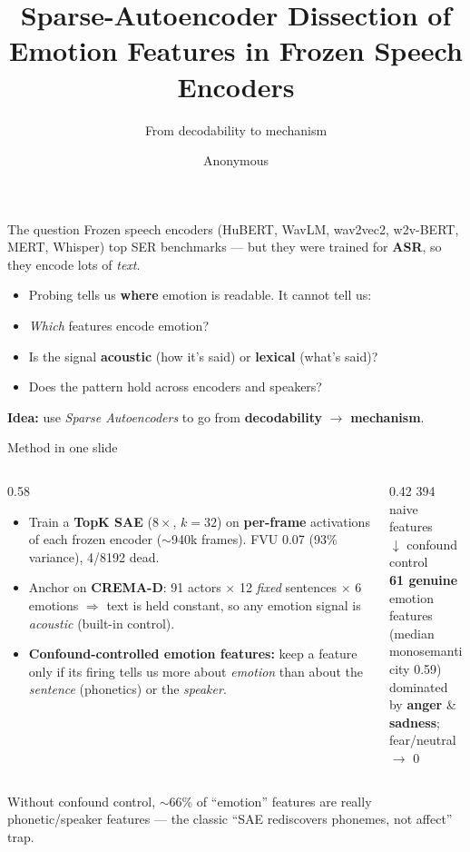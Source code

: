 \documentclass[aspectratio=169]{beamer}
\title[SAE Dissection of SER]{Sparse-Autoencoder Dissection of\\Emotion Features in Frozen Speech Encoders}
\subtitle{From decodability to mechanism}
\author{Anonymous}
\date{}
\begin{document}
\begin{frame}\titlepage\end{frame}

\begin{frame}{The question}
Frozen speech encoders (HuBERT, WavLM, wav2vec2, w2v-BERT, MERT, Whisper) top SER benchmarks --- but they were trained for \textbf{ASR}, so they encode lots of \emph{text}.
\medskip
\begin{itemize}
  \item Probing tells us \textbf{where} emotion is readable. It cannot tell us:
  \item \emph{Which} features encode emotion?
  \item Is the signal \textbf{acoustic} (how it's said) or \textbf{lexical} (what's said)?
  \item Does the pattern hold across encoders and speakers?
\end{itemize}
\medskip
\textbf{Idea:} use \emph{Sparse Autoencoders} to go from \textbf{decodability} $\rightarrow$ \textbf{mechanism}.
\end{frame}

\begin{frame}{Method in one slide}
\begin{columns}
\begin{column}{0.58\textwidth}
\begin{itemize}
  \item Train a \textbf{TopK SAE} ($8\times$, $k{=}32$) on \textbf{per-frame} activations of each frozen encoder ($\sim$940k frames). FVU 0.07 (93\% variance), 4/8192 dead.
  \item Anchor on \textbf{CREMA-D}: 91 actors $\times$ 12 \emph{fixed} sentences $\times$ 6 emotions $\Rightarrow$ text is held constant, so any emotion signal is \emph{acoustic} (built-in control).
  \item \textbf{Confound-controlled emotion features:} keep a feature only if its firing tells us more about \emph{emotion} than about the \emph{sentence} (phonetics) or the \emph{speaker}.
\end{itemize}
\end{column}
\begin{column}{0.42\textwidth}
\centering
\footnotesize
394 naive features\\$\downarrow$ confound control\\\textbf{61 genuine} emotion features\\(median monosemanticity 0.59)\\[1ex]
dominated by \textbf{anger} \& \textbf{sadness};\\ fear/neutral $\to$ 0
\end{column}
\end{columns}
\medskip
\footnotesize Without confound control, $\sim$66\% of ``emotion'' features are really phonetic/speaker features --- the classic ``SAE rediscovers phonemes, not affect'' trap.
\end{frame}
\end{document}
